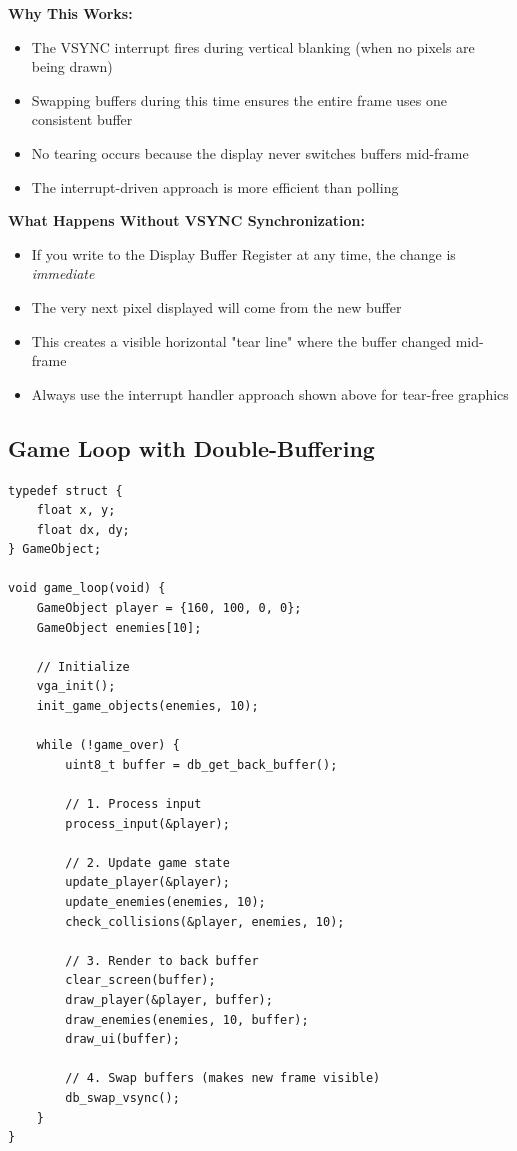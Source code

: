 \documentclass[11pt,letterpaper]{report}
\begin{document}
\textbf{Why This Works:}
\begin{itemize}
    \item The VSYNC interrupt fires during vertical blanking (when no pixels are being drawn)
    \item Swapping buffers during this time ensures the entire frame uses one consistent buffer
    \item No tearing occurs because the display never switches buffers mid-frame
    \item The interrupt-driven approach is more efficient than polling
\end{itemize}

\textbf{What Happens Without VSYNC Synchronization:}
\begin{itemize}
    \item If you write to the Display Buffer Register at any time, the change is \textit{immediate}
    \item The very next pixel displayed will come from the new buffer
    \item This creates a visible horizontal "tear line" where the buffer changed mid-frame
    \item Always use the interrupt handler approach shown above for tear-free graphics
\end{itemize}

\subsection{Game Loop with Double-Buffering}

\begin{lstlisting}[style=c,caption={Typical Game Loop}]
typedef struct {
    float x, y;
    float dx, dy;
} GameObject;

void game_loop(void) {
    GameObject player = {160, 100, 0, 0};
    GameObject enemies[10];
    
    // Initialize
    vga_init();
    init_game_objects(enemies, 10);
    
    while (!game_over) {
        uint8_t buffer = db_get_back_buffer();
        
        // 1. Process input
        process_input(&player);
        
        // 2. Update game state
        update_player(&player);
        update_enemies(enemies, 10);
        check_collisions(&player, enemies, 10);
        
        // 3. Render to back buffer
        clear_screen(buffer);
        draw_player(&player, buffer);
        draw_enemies(enemies, 10, buffer);
        draw_ui(buffer);
        
        // 4. Swap buffers (makes new frame visible)
        db_swap_vsync();
    }
}
\end{lstlisting}
\end{document}
